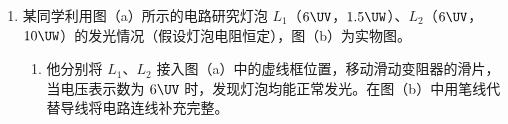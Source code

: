 \documentclass[\gkver]{gaokaozhenti}
\begin{document}
\begin{enumerate}
\begin{enumerate}
	A．取一根细线，下端系住直径为 $d$ 的金属小球，上端固定在铁架台上；
	
	B．用米尺量得细线长度 $l$；
	
	C．在细线偏离竖直方向 $5^{\circ}$ 位置释放小球；
	
	D．用秒表记录小球完成 $n$ 次全振动所用的总时间 $t$，得到周期 $T=t/n$；
	
	E．用公式 $g=\frac{4\pi^{2}l}{T^{2}}$ 计算重力加速度。
	
	按上述方法得出的重力加速度与实际值相比 （选填“偏大”、“相同”或“偏小”）。
	
	\item
	已知单摆在任意摆角 $\theta$ 时的周期公式可近似为 $T'=T_{0}\left[1+a\sin^{2}\frac{\theta}{2}\right]$，式中 $T_{0}$ 为摆角 $\theta$ 趋近于 $0^{\circ}$ 时的周期，$a$ 为常数。为了用图像法验证该关系式，需要测量的物理量有 ；若某同学在实验中得到了如图所示的图线，则图像中的横轴表示 。
\end{enumerate}

\onepicture[align=right, w=4.07cm]{}



\item
某同学利用图（a）所示的电路研究灯泡 $L_{1}$（$6\UV$，$1.5\UW$）、$L_{2}$（$6\UV$，$10\UW$）的发光情况（假设灯泡电阻恒定），图（b）为实物图。

\begin{enumerate}
	\item
	他分别将 $L_{1}$、$L_{2}$ 接入图（a）中的虚线框位置，移动滑动变阻器的滑片，当电压表示数为 $6\UV$ 时，发现灯泡均能正常发光。在图（b）中用笔线代替导线将电路连线补充完整。
	

\end{enumerate}
\end{enumerate}
\end{document}
